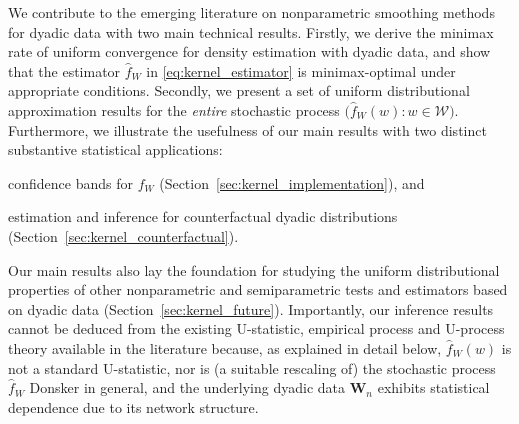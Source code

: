 \documentclass[11pt,lof]{puthesis}
\newcommand{\bW}{\ensuremath{\mathbf{W}}}
\newcommand{\cW}{\ensuremath{\mathcal{W}}}
\theoremstyle{break}
\theoremstyle{proof}
\begin{document}
We contribute to the emerging literature on nonparametric smoothing methods for
dyadic data with two main technical results. Firstly, we derive the minimax
rate of uniform convergence for density estimation with dyadic data, and show
that the estimator $\hat{f}_W$ in \eqref{eq:kernel_estimator} is
minimax-optimal under appropriate conditions. Secondly, we present a set of
uniform distributional approximation results for the \emph{entire} stochastic
process $\big(\hat{f}_W(w):w\in\cW\big)$. Furthermore, we illustrate the
usefulness of our main results with two distinct substantive statistical
applications:
%
\begin{inlineroman}
  \item
    confidence bands for $f_W$ (Section~\ref{sec:kernel_implementation}), and
  \item
    estimation and inference for counterfactual
    dyadic distributions (Section~\ref{sec:kernel_counterfactual}).
\end{inlineroman}
%
Our main results also lay the foundation for studying the uniform
distributional properties of other nonparametric and semiparametric tests and
estimators based on dyadic data (Section~\ref{sec:kernel_future}). Importantly,
our
inference results cannot be deduced from the existing U-statistic, empirical
process and U-process theory available in the literature
\citep{van1996weak,gine2021mathematical} because, as explained in detail below,
$\hat{f}_W(w)$ is not a standard U-statistic, nor is
(a suitable rescaling of) the stochastic process
$\hat{f}_W$ Donsker in general, and the underlying dyadic data $\bW_n$ exhibits
statistical dependence due to its network structure.
\end{document}

